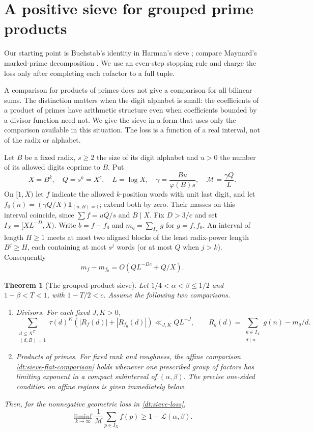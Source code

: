\documentclass[11pt,a4paper]{article}
\theoremstyle{paperplain}
\newtheorem{theorem}{Theorem}[section]
\numberwithin{equation}{section}
\begin{document}
\section{A positive sieve for grouped prime products}
\label{dt:sieve}

Our starting point is Buchstab's identity in Harman's sieve
\cite{Harman2007}; compare Maynard's marked-prime decomposition
\cite[Section~6]{Maynard2019}. We use an even-step stopping rule and
charge the loss only after completing each cofactor to a full tuple.

A comparison for products of primes does not give a comparison for all
bilinear sums. The distinction matters when the digit alphabet is small:
the coefficients of a product of primes have arithmetic structure even
when coefficients bounded by a divisor function need not. We give the
sieve in a form that uses only the comparison available in this situation.
The loss is a function of a real interval, not of the radix or alphabet.

Let $B$ be a fixed radix, $s\ge2$ the size of its digit alphabet and
$u>0$ the number of its allowed digits coprime to $B$. Put
\[
 X=B^k,\quad Q=s^k=X^c,\quad L=\log X,\quad
 \gamma=\frac{Bu}{\varphi(B)s},\quad \mathcal M=\frac{\gamma Q}{L}.
\]
On $[1,X)$ let $f$ indicate the allowed $k$-position words with unit
last digit, and let $f_0(n)=(\gamma Q/X)\mathbf1_{(n,B)=1}$; extend
both by zero. Their masses on this interval coincide, since
$\sum f=uQ/s$ and $B\mid X$. Fix $D>3/c$ and set
$I_X=[XL^{-D},X)$. Write $b=f-f_0$ and $m_g=\sum_{I_X}g$ for
$g=f,f_0$. An interval of length $H\ge1$ meets at most two aligned
blocks of the least radix-power length $B^j\ge H$, each containing at
most $s^j$ words (or at most $Q$ when $j>k$). Consequently
\begin{equation}\label{dt:sieve-mass}
 m_f-m_{f_0}=O(QL^{-Dc}+Q/X).
\end{equation}

\begin{theorem}[The grouped-product sieve]\label{common:positive-sieve}
Let $1/4<\alpha<\beta\le1/2$ and $1-\beta<T<1$, with $1-T/2<c$.
Assume the following two comparisons.
\begin{enumerate}
\item\emph{Divisors.} For each fixed $J,K>0$,
\begin{equation}\label{dt:sieve-type-i}
 \sum_{\substack{d\le X^T\\(d,B)=1}}\tau(d)^K
       (|R_f(d)|+|R_{f_0}(d)|)\ll_{J,K}QL^{-J},
 \qquad R_g(d)=\sum_{\substack{n\in I_X\\d\mid n}}g(n)-m_g/d .
\end{equation}
\item\emph{Products of primes.} For fixed rank and roughness,
the affine comparison \eqref{dt:sieve-flat-comparison} holds whenever
one prescribed group of factors has limiting exponent in a compact
subinterval of $(\alpha,\beta)$. The precise one-sided condition on
affine regions is given immediately below.
\end{enumerate}
Then, for the nonnegative geometric loss in \eqref{dt:sieve-loss},
\[
 \liminf_{k\to\infty}\frac{1}{\mathcal M}\sum_{p\in I_X}f(p)
 \ge 1-\mathscr L(\alpha,\beta).
\]
\end{theorem}
\end{document}
